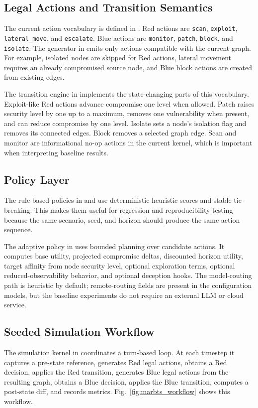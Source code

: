 \documentclass[conference]{IEEEtran}
\begin{document}
\subsection{Legal Actions and Transition Semantics}
The current action vocabulary is defined in . Red actions are \texttt{scan}, \texttt{exploit}, \texttt{lateral\_move}, and \texttt{escalate}. Blue actions are \texttt{monitor}, \texttt{patch}, \texttt{block}, and \texttt{isolate}. The generator in  emits only actions compatible with the current graph. For example, isolated nodes are skipped for Red actions, lateral movement requires an already compromised source node, and Blue block actions are created from existing edges.

The transition engine in  implements the state-changing parts of this vocabulary. Exploit-like Red actions advance compromise one level when allowed. Patch raises security level by one up to a maximum, removes one vulnerability when present, and can reduce compromise by one level. Isolate sets a node's isolation flag and removes its connected edges. Block removes a selected graph edge. Scan and monitor are informational no-op actions in the current kernel, which is important when interpreting baseline results.

\subsection{Policy Layer}
The rule-based policies in  and  use deterministic heuristic scores and stable tie-breaking. This makes them useful for regression and reproducibility testing because the same scenario, seed, and horizon should produce the same action sequence.

The adaptive policy in  uses bounded planning over candidate actions. It computes base utility, projected compromise deltas, discounted horizon utility, target affinity from node security level, optional exploration terms, optional reduced-observability behavior, and optional deception hooks. The model-routing path is heuristic by default; remote-routing fields are present in the configuration models, but the baseline experiments do not require an external LLM or cloud service.

\subsection{Seeded Simulation Workflow}
The simulation kernel in  coordinates a turn-based loop. At each timestep it captures a pre-state reference, generates Red legal actions, obtains a Red decision, applies the Red transition, generates Blue legal actions from the resulting graph, obtains a Blue decision, applies the Blue transition, computes a post-state diff, and records metrics. Fig.~\ref{fig:marbts_workflow} shows this workflow.
\end{document}
